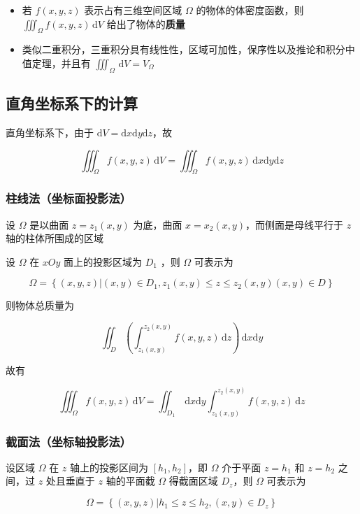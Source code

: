 \documentclass[lang = zh , final , oneside , openany , titlepage , zihao = -4 , linespread = 1.3 , baselineskip = false , cjk-font = windows , text-font = newtx , math-font = newtx]{sjtureport}
\begin{document}
\begin{itemize}
\item
  若 \(f(x,y,z)\) 表示占有三维空间区域 \(\Omega\) 的物体的体密度函数，则 \(\displaystyle\iiint_\Omega f(x,y,z)\,\mathrm{d}V\) 给出了物体的\textbf{质量}
\item
  类似二重积分，三重积分具有线性性，区域可加性，保序性以及推论和积分中值定理，并且有 \(\displaystyle\iiint_\Omega \,\mathrm{d}V = V_\Omega\)
\end{itemize}

\subsection{直角坐标系下的计算}

直角坐标系下，由于 \(\mathrm{d}V=\mathrm{d}x\mathrm{d}y\mathrm{d}z\)，故

\[\iiint_\Omega f(x,y,z)\,\mathrm{d}V = \iiint_\Omega f(x,y,z)\,\mathrm{d}x\mathrm{d}y\mathrm{d}z\]

\subsubsection{柱线法（坐标面投影法）}

设 \(\Omega\) 是以曲面 \(z=z_1(x,y)\) 为底，曲面
\(x=x_2(x,y)\)，而侧面是母线平行于 \(z\) 轴的柱体所围成的区域

设 \(\Omega\) 在 \(xOy\) 面上的投影区域为 \(D_1\) ，则 \(\Omega\)
可表示为

\[\Omega = \left\{(x,y,z)\bigg| (x,y)\in D_1 , z_1(x,y)\leq z\leq z_2(x,y)(x,y)\in D\right\}\]

则物体总质量为

\[\iint_D\left(\int_{z_1(x,y)}^{z_2(x,y)}f(x,y,z)\,\mathrm{d}z\right) \,\mathrm{d}x\mathrm{d}y\]

故有

\[\iiint_\Omega f(x,y,z)\,\mathrm{d}V = \iint_{D_1} \,\mathrm{d}x\mathrm{d}y\int_{z_1(x,y)}^{z_2(x,y)} f(x,y,z)\,\mathrm{d}z\]

\subsubsection{截面法（坐标轴投影法）}

设区域 \(\Omega\) 在 \(z\) 轴上的投影区间为 \([h_1,h_2]\)，即 \(\Omega\)
介于平面 \(z=h_1\) 和 \(z=h_2\) 之间，过 \(z\) 处且垂直于 \(z\)
轴的平面截 \(\Omega\) 得截面区域 \(D_z\)，则 \(\Omega\) 可表示为

\[\Omega = \left\{(x,y,z)\bigg| h_1\leq z\leq h_2 , (x,y)\in D_z\right\}\]
\end{document}
